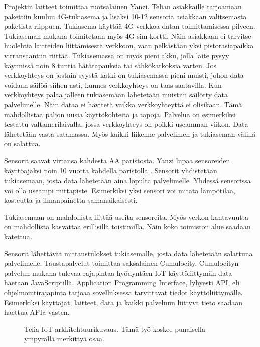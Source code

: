 \documentclass{tktltiki}
\begin{document}
Projektin laitteet toimittaa ruotsalainen Yanzi. Telian asiakkaille tarjoamaan pakettiin kuuluu 4G-tukiasema ja lisäksi 10-12 sensoria asiakkaan valitsemasta paketista riippuen. Tukiasema käyttää 4G verkkoa datan toimittamisessa pilveen. Tukiaseman mukana toimitetaan myös 4G sim-kortti. Näin asiakkaan ei tarvitse huolehtia laitteiden liittämisestä verkkoon, vaan pelkästään yksi pistorasiapaikka virransaantiin riittää. Tukiasemassa on myös pieni akku, jolla laite pysyy käynnissä noin 8 tuntia hätätapauksia tai sähkökatkoksia varten. Jos verkkoyhteys on jostain syystä katki on tukiasemassa pieni muisti, johon data voidaan säilöä siihen asti, kunnes verkkoyhteys on taas saatavilla. Kun verkkoyhteys palaa jälleen tukiasemaan lähetetään muistiin säilötty data palvelimelle. Näin dataa ei hävitetä vaikka verkkoyhteyttä ei olisikaan. Tämä mahdollistaa paljon uusia käyttökohteita ja tapoja. Palvelua on esimerkiksi testattu valtamerilaivalla, jossa verkkoyhteys on poikki useamman viikon. Data lähetetään vasta satamassa. Myös kaikki liikenne palvelimen ja tukiaseman välillä on salattua.

Sensorit saavat virtansa kahdesta AA paristosta. Yanzi lupaa sensoreiden käyttöajaksi noin 10 vuotta kahdella paristolla \cite{Yanzi}. Sensorit yhdistetään tukiasemaan, josta data lähetetään aina lopulta palvelimelle. Yhdessä sensorissa voi olla useampi mittapiste. Esimerkiksi yksi sensori voi mitata lämpötilaa, kosteutta ja ilmanpainetta samanaikaisesti. 

Tukiasemaan on mahdollista liittää useita sensoreita. Myös verkon kantavuutta on mahdollista kasvattaa erillisillä toistimilla. Näin koko toimiston alue saadaan katettua. 

Sensorit lähettävät mittaustulokset tukiasemalle, josta data lähetetään salattuna palvelimelle. Taustapalvelut toimittaa saksalainen Cumulocity. Cumulocityn palvelun mukana tulevaa rajapintaa hyödyntäen IoT käyttöliittymän data haetaan JavaScriptillä. Application Programming Interface, lyhyesti API, eli ohjelmointirajapinta tarjoaa sovelluksessa tarvittavat tiedot käyttöliittymälle. Esimerkiksi käyttäjät, laitteet, data ja kaikki palveluun liittyvä tieto saadaan haettua APIa vasten. 

\begin{figure}[h]
\begin{center}
\caption{Telia IoT arkkitehtuurikuvaus. Tämä työ koskee punaisella ympyrällä merkittyä osaa.}
\label{Arkkitehtuurikuvaus}
\end{center}
\end{figure}
\end{document}
